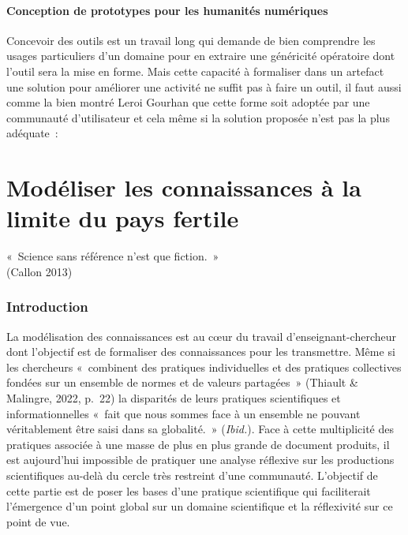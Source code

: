 \documentclass[
  letterpaper,
  DIV=11,
  numbers=noendperiod]{scrreprt}
\begin{document}
\hypertarget{sec-protosHN}{%
\subsection{Conception de prototypes pour les humanités
numériques}\label{sec-protosHN}}

Concevoir des outils est un travail long qui demande de bien comprendre
les usages particuliers d'un domaine pour en extraire une généricité
opératoire dont l'outil sera la mise en forme. Mais cette capacité à
formaliser dans un artefact une solution pour améliorer une activité ne
suffit pas à faire un outil, il faut aussi comme la bien montré Leroi
Gourhan que cette forme soit adoptée par une communauté d'utilisateur et
cela même si la solution proposée n'est pas la plus adéquate~:

\part{Modéliser les connaissances à la limite du pays fertile}

\leavevmode{}%
«~Science sans référence n'est que fiction.~»\\
(Callon 2013)

\hypertarget{introduction}{%
\section*{Introduction}\label{introduction}}


La modélisation des connaissances est au cœur du travail
d'enseignant-chercheur dont l'objectif est de formaliser des
connaissances pour les transmettre. Même si les chercheurs «~combinent
des pratiques individuelles et des pratiques collectives fondées sur un
ensemble de normes et de valeurs partagées~» (Thiault \& Malingre, 2022,
p.~22) la disparités de leurs pratiques scientifiques et
informationnelles «~fait que nous sommes face à un ensemble ne pouvant
véritablement être saisi dans sa globalité.~» (\emph{Ibid.}). Face à
cette multiplicité des pratiques associée à une masse de plus en plus
grande de document produits, il est aujourd'hui impossible de pratiquer
une analyse réflexive sur les productions scientifiques au-delà du
cercle très restreint d'une communauté. L'objectif de cette partie est
de poser les bases d'une pratique scientifique qui faciliterait
l'émergence d'un point global sur un domaine scientifique et la
réflexivité sur ce point de vue.
\end{document}
